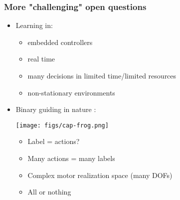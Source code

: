 \documentclass{beamer}
\begin{document}
\begin{frame}\frametitle{More "challenging" open questions}
	\begin{itemize}
		\item Learning in:
			\begin{itemize}
				\item embedded controllers
				\item real time
				\item many decisions in limited time/limited resources
				\item non-stationary environments
			\end{itemize}
		\item Binary guiding in nature :
\centerline{\texttt{[image: figs/cap-frog.png]}}		
		\begin{itemize}
			\item Label = actions?
			\item Many actions = many labels
			\item Complex motor realization space (many DOFs)
			\item All or nothing
		\end{itemize}
		
	\end{itemize}
	

\end{frame}
\end{document}
